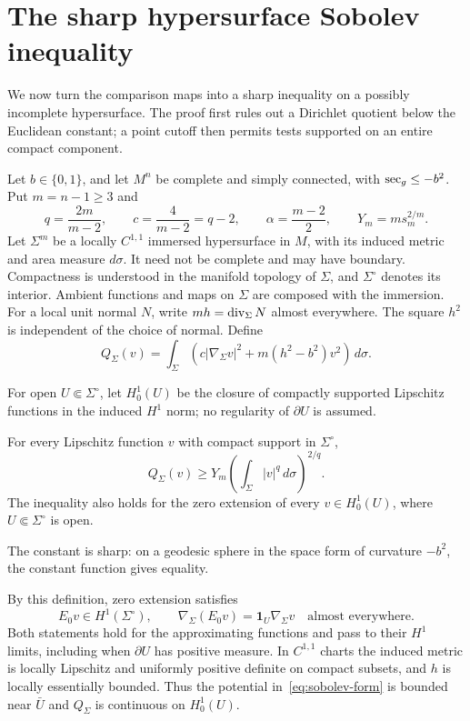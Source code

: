 \section{The sharp hypersurface Sobolev inequality}
\label{sec:sobolev}

We now turn the comparison maps into a sharp inequality on a possibly
incomplete hypersurface. The proof first rules out a Dirichlet quotient
below the Euclidean constant; a point cutoff then permits tests supported
on an entire compact component.

Let $b\in\{0,1\}$, and let $M^n$ be complete and simply connected,
with $\operatorname{sec}_g\le-b^2$. Put $m=n-1\ge3$ and
\[
 q=\frac{2m}{m-2},\qquad c=\frac4{m-2}=q-2,\qquad
 \alpha=\frac{m-2}{2},\qquad Y_m=m s_m^{2/m}.
\]
Let $\Sigma^m$ be a locally $C^{1,1}$ immersed hypersurface in $M$,
with its induced metric and area measure $d\sigma$. It need not be
complete and may have boundary. Compactness is understood in the
manifold topology of $\Sigma$, and $\Sigma^\circ$ denotes its interior.
Ambient functions and maps on $\Sigma$ are composed with the immersion.
For a local unit normal $N$, write $mh=\operatorname{div}_\Sigma N$ almost everywhere.
The square $h^2$ is independent of the choice of normal. Define
\begin{equation}
\label{eq:sobolev-form}
 Q_\Sigma(v)=\int_\Sigma
 \left(c|\nabla_\Sigma v|^2+m(h^2-b^2)v^2\right)\,d\sigma.
\end{equation}

For open $U\Subset\Sigma^\circ$, let $H^1_0(U)$ be the closure of
compactly supported Lipschitz functions in the induced $H^1$ norm;
no regularity of $\partial U$ is assumed.

\begin{theorem}
\label{thm:extrinsic-sobolev}
For every Lipschitz function $v$ with compact support in $\Sigma^\circ$,
\begin{equation}
\label{eq:extrinsic-sobolev}
 Q_\Sigma(v)\ge
 Y_m\left(\int_\Sigma |v|^q\,d\sigma\right)^{2/q}.
\end{equation}
The inequality also holds for the zero extension of every
$v\in H^1_0(U)$, where $U\Subset\Sigma^\circ$ is open.
\end{theorem}

The constant is sharp: on a geodesic sphere in the space form of
curvature $-b^2$, the constant function gives equality.

By this definition, zero extension satisfies
\begin{equation}
\label{eq:sobolev-zero-extension}
 E_0v\in H^1(\Sigma^\circ),\qquad
 \nabla_\Sigma(E_0v)=\mathbf1_U\nabla_\Sigma v
 \quad\text{almost everywhere}.
\end{equation}
Both statements hold for the approximating functions and pass to their
$H^1$ limits, including when $\partial U$ has positive measure.
In $C^{1,1}$ charts the induced metric is locally Lipschitz and uniformly
positive definite on compact subsets, and $h$ is locally essentially
bounded. Thus the potential in~\eqref{eq:sobolev-form} is bounded
near $\bar U$ and $Q_\Sigma$ is continuous on $H^1_0(U)$.

